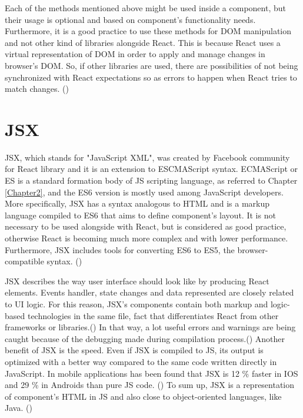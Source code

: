 Each of the methods mentioned above might be used inside a component, but their usage is optional and based on component's functionality needs. Furthermore, it is a good practice to use these methods for DOM manipulation and not other kind of libraries alongside React. This is because React uses a virtual representation of DOM in order to apply and manage changes in browser's DOM. So, if other libraries are used, there are possibilities of not being synchronized with React expectations so as errors to happen when React tries to match changes. (\cite{Reference13}) \par

\section{JSX}

JSX, which stands for "JavaScript XML", was created by Facebook community for React library and it is an extension to ESCMAScript syntax. ECMAScript or ES is a standard formation body of JS scripting language, as referred to Chapter \ref{Chapter2}, and the ES6 version is mostly used among JavaScript developers. More specifically, JSX has a syntax analogous to HTML and is a markup language compiled to ES6 that aims to define component's layout. It is not necessary to be used alongside with React, but is considered as good practice, otherwise React is becoming much more complex and with lower performance. Furthermore, JSX includes tools for converting ES6 to ES5, the browser-compatible syntax. (\cite{Reference13}) \par

JSX describes the way user interface should look like by producing React elements. Events handler, state changes and data represented are closely related to UI logic. For this reason, JSX's components contain both markup and logic-based technologies in the same file, fact that differentiates React from other frameworks or libraries.(\cite{Reference16}) In that way, a lot useful errors and warnings are being caught because of the debugging made during compilation process.(\cite{Reference10}) Another benefit of JSX is the speed. Even if JSX is compiled to JS, its output is optimized with a better way compared to the same code written directly in JavaScript. In mobile applications has been found that JSX is 12 \% faster in IOS and 29 \% in Androids than pure JS code. (\cite{Reference14}) To sum up, JSX is a representation of component's HTML in JS and also close to object-oriented languages, like Java. (\cite{Reference13})

